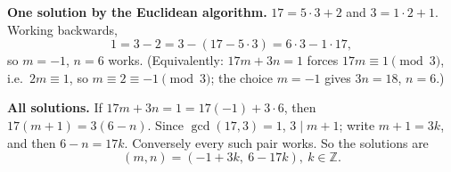 \textbf{One solution by the Euclidean algorithm.} $17=5\cdot3+2$ and $3=1\cdot2+1$. Working backwards,
\[
1=3-2=3-(17-5\cdot3)=6\cdot3-1\cdot17,
\]
so $m=-1$, $n=6$ works. (Equivalently: $17m+3n=1$ forces $17m\equiv1\pmod3$, i.e.\ $2m\equiv1$, so $m\equiv2\equiv-1\pmod3$; the choice $m=-1$ gives $3n=18$, $n=6$.)

\textbf{All solutions.} If $17m+3n=1=17(-1)+3\cdot6$, then $17(m+1)=3(6-n)$. Since $\gcd(17,3)=1$, $3\mid m+1$; write $m+1=3k$, and then $6-n=17k$. Conversely every such pair works. So the solutions are
\[
\boxed{(m,n)=(-1+3k,\ 6-17k),\ k\in\mathbb Z}.
\]
